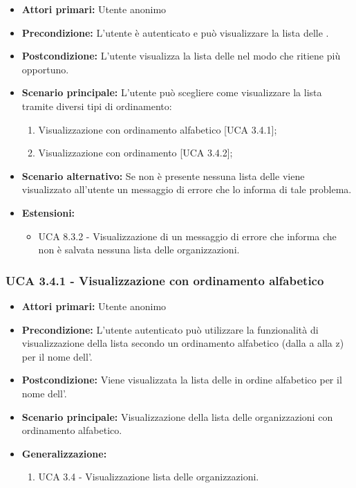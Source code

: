 \begin{itemize} 
	\item \textbf{Attori primari:} Utente anonimo
	\item \textbf{Precondizione:}  L'utente è autenticato e può visualizzare la lista delle .
	\item \textbf{Postcondizione:} L'utente visualizza la lista delle  nel modo che ritiene più opportuno.
	\item \textbf{Scenario principale:}	L'utente può scegliere come visualizzare la lista tramite diversi tipi di ordinamento:
	\begin{enumerate}
		\item Visualizzazione con ordinamento alfabetico [UCA 3.4.1];
		\item Visualizzazione con ordinamento  [UCA 3.4.2];
	\end{enumerate}
	\item \textbf{Scenario alternativo:} Se non è presente nessuna lista delle  viene visualizzato all'utente un messaggio di errore che lo informa di tale problema.
	\item \textbf{Estensioni:}
	\begin{itemize}
		\item UCA 8.3.2 - Visualizzazione di un messaggio di errore che informa che non è salvata nessuna lista delle organizzazioni.
	\end{itemize}
\end{itemize}

\subsubsection{UCA 3.4.1 - Visualizzazione con ordinamento alfabetico}%
\begin{itemize}
	\item \textbf{Attori primari:} Utente anonimo
	\item \textbf{Precondizione:} L'utente autenticato può utilizzare la funzionalità di visualizzazione della lista secondo un ordinamento alfabetico (dalla a alla z) per il nome dell'.
	\item \textbf{Postcondizione:} Viene visualizzata la lista delle  in ordine alfabetico per il nome dell'.
	\item \textbf{Scenario principale:} Visualizzazione della lista delle organizzazioni con ordinamento alfabetico.
	\item \textbf{Generalizzazione:}
	\begin{enumerate}
		\item UCA 3.4 - Visualizzazione lista delle organizzazioni.
	\end{enumerate}	
\end{itemize}

